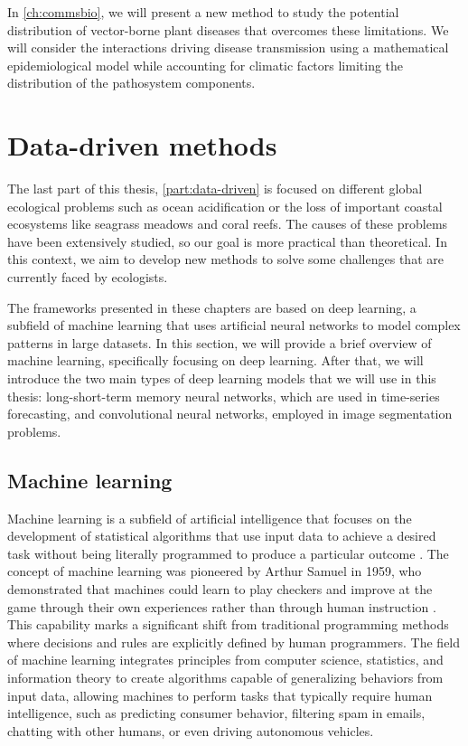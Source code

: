 In \cref{ch:commsbio}, we will present a new method to study the potential
distribution of vector-borne plant diseases that overcomes these limitations.
We will consider the interactions driving disease transmission using a
mathematical epidemiological model while accounting for climatic factors
limiting the distribution of the pathosystem components.

\section{\label{sec:Data-driven methods} Data-driven methods}

The last part of this thesis, \cref{part:data-driven} is focused on different
global ecological problems such as ocean acidification or the loss of
important
coastal ecosystems like seagrass meadows and coral reefs. The causes of
these problems have been extensively studied, so our goal is more
practical than theoretical. In this context, we aim to develop new methods to
solve some challenges that are currently faced by ecologists.

The frameworks presented in these chapters are based on deep learning, a
subfield of machine learning that uses artificial neural networks to model
complex patterns in large datasets. In this section, we will provide a brief
overview of machine learning, specifically focusing on deep learning. After
that, we will introduce the two main types of deep learning models that we
will
use in this thesis: long-short-term memory neural networks, which are used in
time-series forecasting, and convolutional neural networks, employed in image
segmentation problems.

\subsection{\label{sec:Machine learning} Machine learning}

Machine learning is a subfield of artificial intelligence that focuses on the
development of statistical algorithms that use input data to achieve a
desired task without being literally programmed to produce a particular outcome
\cite{Michalski2013,ElNaqa2015}. The concept of machine learning was
pioneered by Arthur Samuel in 1959, who demonstrated that machines could learn
to play checkers and improve at the game through their own experiences rather
than through human instruction \cite{Samuel2000}. This capability marks a
significant shift from traditional programming methods where decisions and
rules are explicitly defined by human programmers. The field of machine
learning integrates principles from computer science, statistics, and
information theory to create algorithms capable of generalizing behaviors
from input data, allowing machines to perform tasks that typically require
human intelligence, such as predicting consumer behavior, filtering spam in
emails, chatting with other humans, or even driving autonomous vehicles.

